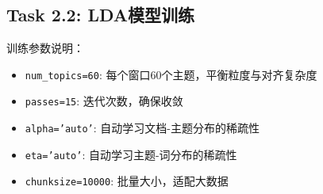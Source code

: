 \documentclass[12pt, a4paper]{ctexart}
\newenvironment{note}{%
  \begin{tcolorbox}[colback=blue!5, colframe=blue!50!black, boxrule=0.5pt, arc=2pt, breakable, title=\textbf{说明}]
}{%
  \end{tcolorbox}
}
\begin{document}
\subsection{Task 2.2: LDA模型训练}

\begin{note}
训练参数说明：
\begin{itemize}
    \item \texttt{num\_topics=60}: 每个窗口60个主题，平衡粒度与对齐复杂度
    \item \texttt{passes=15}: 迭代次数，确保收敛
    \item \texttt{alpha='auto'}: 自动学习文档-主题分布的稀疏性
    \item \texttt{eta='auto'}: 自动学习主题-词分布的稀疏性
    \item \texttt{chunksize=10000}: 批量大小，适配大数据
\end{itemize}
\end{note}
\end{document}
